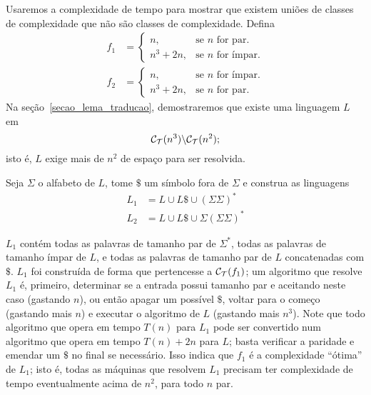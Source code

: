 \begin{counterexample}
    Usaremos a complexidade de tempo para mostrar que
    existem uniões de classes de complexidade
    que não são classes de complexidade.
    Defina
    \begin{align*}
        f_1 & = \begin{cases}
                    n, & \text{se $n$ for par.} \\
                    n^3 + 2n, & \text{se $n$ for ímpar.}
                \end{cases} \\
        f_2 & = \begin{cases}
                    n, & \text{se $n$ for ímpar.} \\
                    n^3 + 2n, & \text{se $n$ for par.}
                \end{cases}
    \end{align*}
    Na seção~\ref{secao_lema_traducao},
    demostraremos que existe uma linguagem $L$ em
    \begin{equation*}
        \mathcal C_{\mathcal{T}}(n^3) \backslash \mathcal C_{\mathcal{T}}(n^2);
    \end{equation*}
    isto é, $L$ exige mais de $n^2$ de espaço para ser resolvida.

    Seja $\Sigma$ o alfabeto de $L$,
    tome $\$$ um símbolo fora de $\Sigma$
    e construa as linguagens
    \begin{align*}
        L_1 &= L \cup L\$ \cup ( \Sigma \Sigma )^* \\
        L_2 &= L \cup L\$ \cup \Sigma ( \Sigma \Sigma )^*
    \end{align*}

    $L_1$ contém todas as palavras de tamanho par de $\Sigma^*$,
    todas as palavras de tamanho ímpar de $L$,
    e todas as palavras de tamanho par de $L$ concatenadas com $\$$.
    $L_1$ foi construída de forma que pertencesse
    a $\mathcal C_{\mathcal{T}}(f_1)$;
    um algoritmo que resolve $L_1$
    é, primeiro, determinar se a entrada possui tamanho par
    e aceitando neste caso
    (gastando $n$),
    ou então apagar um possível $\$$,
    voltar para o começo
    (gastando mais $n$)
    e executar o algoritmo de $L$
    (gastando mais $n^3$).
    Note que todo algoritmo que opera em tempo $T(n)$
    para $L_1$
    pode ser convertido num algoritmo que opera em tempo
    $T(n) + 2n$ para $L$;
    basta verificar a paridade e emendar um $\$$ no final
    se necessário.
    Isso indica que $f_1$ é a complexidade ``ótima''
    de $L_1$;
    isto é,
    todas as máquinas que resolvem $L_1$
    precisam ter complexidade de tempo
    eventualmente acima de $n^2$,
    para todo $n$ par.


\end{counterexample}
